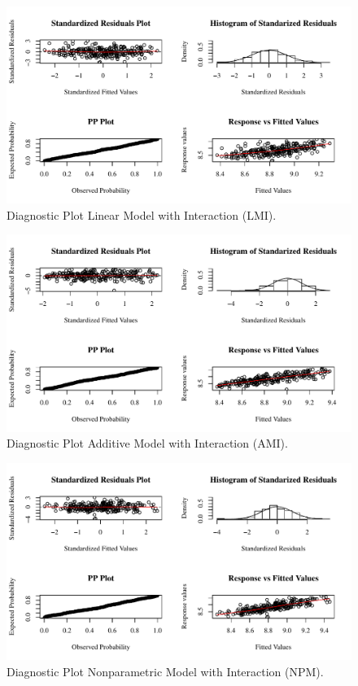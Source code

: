 \documentclass{article}\usepackage[]{graphicx}\usepackage[]{color}
\begin{document}
\begin{figure}[bp!]
\centering
\includegraphics[scale=0.8]{Diag_b_lm_2004.pdf}
\caption{Diagnostic Plot Linear Model with Interaction (LMI).}
\label{fig:Diag LMI}
\end{figure}

\begin{figure}[bp!]
\centering
\includegraphics[scale=0.8]{Diag_b_gam_comp_2004.pdf}
\caption{Diagnostic Plot Additive Model with Interaction (AMI).}
\label{fig:Diag AMI}
\end{figure}

\begin{figure}[bp!]
\centering
\includegraphics[scale=0.8]{Diag_b_vc_2004.pdf}
\caption{Diagnostic Plot Nonparametric Model with Interaction (NPM).}
\label{fig:Diag NPM}
\end{figure}
\end{document}
